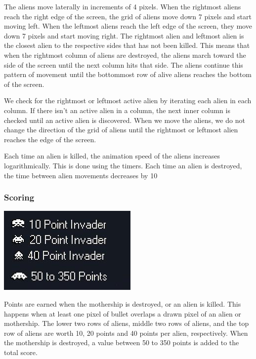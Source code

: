 \documentclass[11pt,letter,oneside]{report}
\begin{document}
The aliens move laterally in increments of 4 pixels.  When the rightmost aliens reach the right edge of the screen, the grid of aliens move down 7 pixels and start moving left.  When the leftmost aliens reach the left edge of the screen, they move down 7 pixels and start moving right.  The rightmost alien and leftmost alien is the closest alien to the respective sides that has not been killed. This means that when the rightmost column of aliens are destroyed, the aliens march toward the side of the screen until the next column hits that side. The aliens continue this pattern of movement until the bottommost row of alive aliens reaches the bottom of the screen. 

We check for the rightmost or leftmost active alien by iterating each alien in each column. If there isn't an active alien in a column, the next inner column is checked until an active alien is discovered. When we move the aliens, we do not change the direction of the grid of aliens until the rightmost or leftmost alien reaches the edge of the screen.

Each time an alien is killed, the animation speed of the aliens increases logarithmically. This is done using the timers. Each time an alien is destroyed, the time between alien movements decreases by 10%

\subsubsection{Scoring}
\includegraphics[]{scoring.jpg}

Points are earned when the mothership is destroyed, or an alien is killed. This happens when at least one pixel of bullet overlaps a drawn pixel of an alien or mothership. The lower two rows of aliens, middle two rows of aliens, and the top row of aliens are worth 10, 20 points and 40 points per alien, respectively. When the mothership is destroyed, a value between 50 to 350 points is added to the total score.
\end{document}
